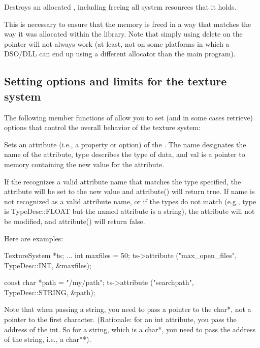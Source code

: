 Destroys an allocated \TextureSystem, including freeing all system
resources that it holds.

This is necessary to ensure that the memory is freed in a way that
matches the way it was allocated within the library.  Note that simply
using {\cf delete} on the pointer will not always work (at least,
not on some platforms in which a DSO/DLL can end up using a different
allocator than the main program).
\apiend

\subsection{Setting options and limits for the texture system}
\label{sec:texturesys:api:options}

The following member functions of \TextureSystem allow you to set
(and in some cases retrieve) options that control the overall
behavior of the texture system:


Sets an attribute (i.e., a property or option) of the \TextureSystem.
The {\cf name} designates the name of the attribute, {\cf type}
describes the type of data, and {\cf val} is a pointer to memory 
containing the new value for the attribute.

If the \TextureSystem recognizes a valid attribute name that matches the
type specified, the attribute will be set to the new value and {\cf
  attribute()} will return {\cf true}.  If {\cf name} is not recognized
as a valid attribute name, or if the types do not match (e.g., {\cf
  type} is {\cf TypeDesc::FLOAT} but the named attribute is a string),
the attribute will not be modified, and {\cf attribute()} will return
{\cf false}.

Here are examples:

\begin{code}
      TextureSystem *ts; 
      ...
      int maxfiles = 50;
      ts->attribute ("max_open_files", TypeDesc::INT, &maxfiles);

      const char *path = "/my/path";
      ts->attribute ("searchpath", TypeDesc::STRING, &path);
\end{code}

Note that when passing a string, you need to pass a pointer to the {\cf
  char*}, not a pointer to the first character.  (Rationale: for an {\cf
  int} attribute, you pass the address of the {\cf int}.  So for a
string, which is a {\cf char*}, you need to pass the address of the
string, i.e., a {\cf char**}).

